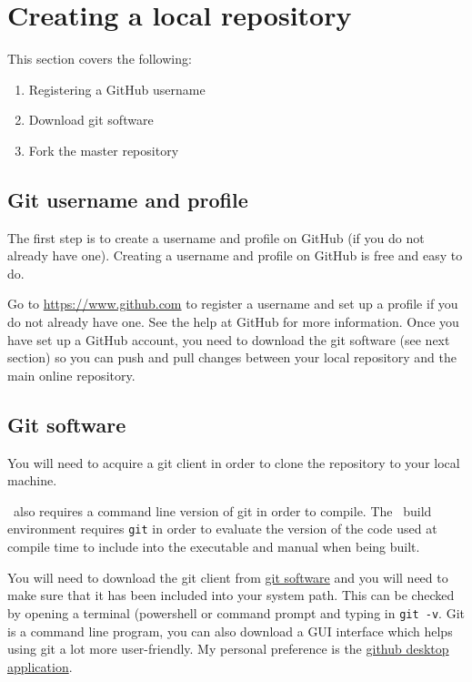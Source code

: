 \section{Creating a local repository\label{sec:local_repo}}

This section covers the following:

\begin{enumerate}
	\item Registering a GitHub username
	\item Download git software
	\item Fork the master repository
\end{enumerate}

\subsection{Git username and profile}

The first step is to create a username and profile on GitHub (if you do not already have one). Creating a username and profile on GitHub is free and easy to do. 

Go to \url{https://www.github.com} to register a username and set up a profile if you do not already have one. See the help at GitHub for more information. Once you have set up a GitHub account, you need to download the git software (see next section) so you can push and pull changes between your local repository and the main online repository.

\subsection{Git software}

You will need to acquire a git client in order to clone the repository to your local machine.

\CNAME\ also requires a command line version of git in order to compile. The \CNAME\ build environment requires \texttt{git} in order to evaluate the version of the code used at compile time to include into the executable and manual when being built. 

You will need to download the git client from \href{https://git-scm.com/downloads}{git software} and you will need to make sure that it has been included into your system path. This can be checked by opening a terminal (powershell or command prompt and typing in \texttt{git -v}. Git is a command line program, you can also download a GUI interface which helps using git a lot more user-friendly. My personal preference is the \href{https://desktop.github.com/}{github desktop application}. 

